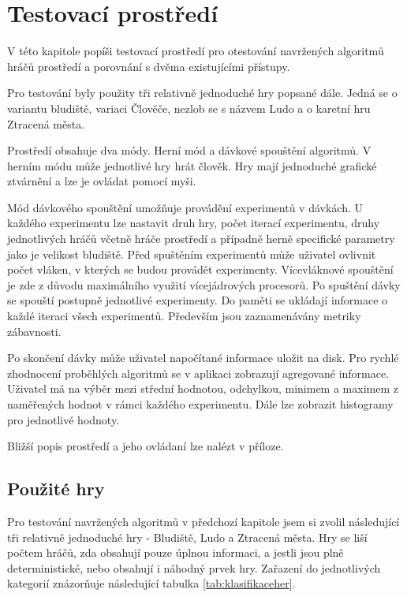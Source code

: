 \chapter{Testovací prostředí}

V této kapitole popíši testovací prostředí pro otestování navržených algoritmů hráčů prostředí a porovnání s dvěma existujícími přístupy.

Pro testování byly použity tři relativně jednoduché hry popsané dále. Jedná se o variantu bludiště, variaci Člověče, nezlob se s názvem Ludo a o karetní hru Ztracená města.

Prostředí obsahuje dva módy. Herní mód a dávkové spouštění algoritmů. V herním módu může jednotlivé hry hrát člověk. Hry mají jednoduché grafické ztvárnění a lze je ovládat pomocí myši.

Mód dávkového spouštění umožňuje provádění experimentů v dávkách. U každého experimentu lze nastavit druh hry, počet iterací experimentu, druhy jednotlivých hráčů včetně hráče prostředí a případně herně specifické parametry jako je velikost bludiště. Před spuštěním experimentů může uživatel ovlivnit počet vláken, v kterých se budou provádět experimenty. Vícevláknové spouštění je zde z důvodu maximálního využití vícejádrových procesorů. Po spuštění dávky se spouští postupně jednotlivé experimenty. Do paměti se ukládají informace o každé iteraci všech experimentů. Především jsou zaznamenávány metriky zábavnosti. 

Po skončení dávky může uživatel napočítané informace uložit na disk. Pro rychlé zhodnocení proběhlých algoritmů se v aplikaci zobrazují agregované informace. Uživatel má na výběr mezi střední hodnotou, odchylkou, minimem a maximem z naměřených hodnot v rámci každého experimentu. Dále lze zobrazit histogramy pro jednotlivé hodnoty.

Bližší popis prostředí a jeho ovládaní lze nalézt v příloze.

\section{Použité hry}

Pro testování navržených algoritmů v předchozí kapitole jsem si zvolil následující tři relativně jednoduché hry - Bludiště, Ludo a Ztracená města. Hry se liší počtem hráčů, zda obsahují pouze úplnou informaci, a jestli jsou plně deterministické, nebo obsahují i náhodný prvek hry. Zařazení do jednotlivých kategorií znázorňuje následující tabulka \ref{tab:klasifikaceher}.

